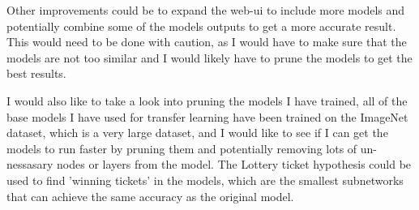 \documentclass[]{final_report}
\begin{document}
Other improvements could be to expand the web-ui to include more models and potentially combine some of the models outputs to get a more accurate result. This would need to be done with caution, as I would have to make sure that the models are not too similar and I would likely have to prune the models to get the best results.

I would also like to take a look into pruning the models I have trained, all of the base models I have used for transfer learning have been trained on the ImageNet dataset, which is a very large dataset, and I would like to see if I can get the models to run faster by pruning them and potentially removing lots of un-nessasary nodes or layers from the model. The Lottery ticket hypothesis\cite{lotteryticket} could be used to find 'winning tickets' in the models, which are the smallest subnetworks that can achieve the same accuracy as the original model.

\newpage
\printbibliography
\label{endpage}
\end{document}
